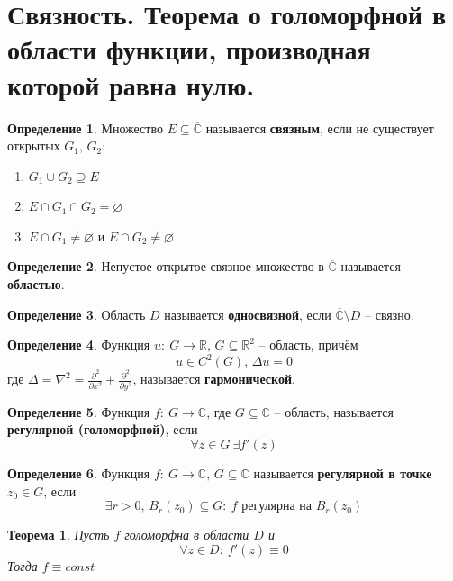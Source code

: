 \documentclass[a4paper,12pt]{article}
\renewcommand{\emptyset}{\ensuremath{\varnothing}}
\theoremstyle{plain}
\newtheorem{theorem}{Теорема}[section]
\theoremstyle{definition}
\newtheorem{definition}{Определение}[section]
\theoremstyle{remark}
\begin{document}
\section{Связность. Теорема о голоморфной в области функции, производная которой равна нулю.}
\begin{definition}
	Множество $E \subseteq \overline{\mathbb{C}}$ называется \textbf{связным}, если не существует открытых $G_1,\, G_2$:
	\begin{enumerate}
		\item $G_1 \cup G_2 \supseteq E$
		\item $E \cap G_1 \cap G_2 = \emptyset$
		\item $E \cap G_1 \neq \emptyset$ и $E \cap G_2 \neq \emptyset$
	\end{enumerate}
\end{definition}

\begin{definition}
	Непустое открытое связное множество в $\overline{\mathbb{C}}$ называется \textbf{областью}.
\end{definition}

\begin{definition}
	Область $D$ называется \textbf{односвязной}, если $\overline{\mathbb{C}} \setminus D$ -- связно.
\end{definition}

\begin{definition}
	Функция $u :\: G \to \mathbb{R},\, G \subseteq \mathbb{R}^2$ -- область, причём
	\[
		u \in C^2(G),\, \Delta u = 0
	\]
	где $\Delta = \nabla^2 = \frac{\partial^2}{\partial x^2} + \frac{\partial^2}{\partial y^2}$, называется \textbf{гармонической}.
\end{definition}

\begin{definition}
	Функция $f :\: G \to \mathbb{C}$, где $G \subseteq \mathbb{C}$ -- область, называется \textbf{регулярной (голоморфной)}, если
	\[
		\forall z \in G \: \exists f'(z)
	\]
\end{definition}

\begin{definition}
	Функция $f :\: G \to \mathbb{C},\, G \subseteq \mathbb{C}$ называется \textbf{регулярной в точке} $z_0 \in G$, если
	\[
		\exists r > 0,\, B_r(z_0) \subseteq G :\: f \text{ регулярна на }B_r(z_0)
	\]
\end{definition}

\begin{theorem}
	Пусть $f$ голоморфна в области $D$ и
	\[
		\forall z \in D :\: f'(z) \equiv 0
	\]
	Тогда $f \equiv const$
\end{theorem}
\end{document}
